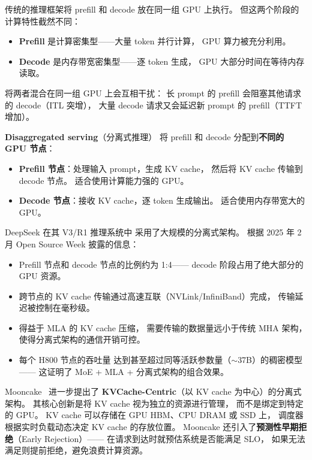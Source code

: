 传统的推理框架将 prefill 和 decode 放在同一组 GPU 上执行。
但这两个阶段的计算特性截然不同：
\begin{itemize}[noitemsep]
  \item \textbf{Prefill} 是计算密集型——大量 token 并行计算，
        GPU 算力被充分利用。
  \item \textbf{Decode} 是内存带宽密集型——逐 token 生成，
        GPU 大部分时间在等待内存读取。
\end{itemize}

将两者混合在同一组 GPU 上会互相干扰：
长 prompt 的 prefill 会阻塞其他请求的 decode（ITL 突增），
大量 decode 请求又会延迟新 prompt 的 prefill（TTFT 增加）。

\textbf{Disaggregated serving}（分离式推理）
将 prefill 和 decode 分配到\textbf{不同的 GPU 节点}：
\begin{itemize}[noitemsep]
  \item \textbf{Prefill 节点}：处理输入 prompt，生成 KV cache，
        然后将 KV cache 传输到 decode 节点。
        适合使用计算能力强的 GPU。
  \item \textbf{Decode 节点}：接收 KV cache，逐 token 生成输出。
        适合使用内存带宽大的 GPU。
\end{itemize}

\begin{corebox}
DeepSeek 在其 V3/R1 推理系统中
采用了大规模的分离式架构。
根据 2025 年 2 月 Open Source Week 披露的信息：

\begin{itemize}[noitemsep]
  \item Prefill 节点和 decode 节点的比例约为 1:4——
        decode 阶段占用了绝大部分的 GPU 资源。
  \item 跨节点的 KV cache 传输通过高速互联（NVLink/InfiniBand）完成，
        传输延迟被控制在毫秒级。
  \item 得益于 MLA 的 KV cache 压缩，
        需要传输的数据量远小于传统 MHA 架构，
        使得分离式架构的通信开销可控。
  \item 每个 H800 节点的吞吐量
        达到甚至超过同等活跃参数量（$\sim$37B）的稠密模型——
        这证明了 MoE + MLA + 分离式架构的组合效果。
\end{itemize}
\end{corebox}

Mooncake~\cite{qin2024mooncake} 进一步提出了
\textbf{KVCache-Centric}（以 KV cache 为中心）的分离式架构。
其核心创新是将 KV cache 视为独立的资源进行管理，
而不是绑定到特定的 GPU。
KV cache 可以存储在 GPU HBM、CPU DRAM 或 SSD 上，
调度器根据实时负载动态决定 KV cache 的存放位置。
Mooncake 还引入了\textbf{预测性早期拒绝}（Early Rejection）——
在请求到达时就预估系统是否能满足 SLO，
如果无法满足则提前拒绝，避免浪费计算资源。

